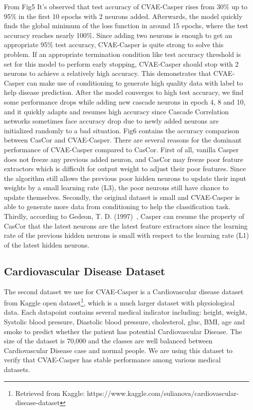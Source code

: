 From Fig5 It’s observed that test accuracy of CVAE-Casper rises from 30\% up to 95\% in the first 10 epochs with 2 neurons added. Afterwards, the model quickly finds the global minimum of the loss function in around 15 epochs, where the test accuracy reaches nearly 100\%. Since adding two neurons is enough to get an appropriate 95\% test accuracy, CVAE-Casper is quite strong to solve this problem. If an appropriate termination condition like test accuracy threshold is set for this model to perform early stopping, CVAE-Casper should stop with 2 neurons to achieve a relatively high accuracy. This demonstrates that CVAE-Casper can make use of conditioning to generate high quality data with label to help disease prediction. After the model converges to high test accuracy, we find some performance drops while adding new cascade neurons in epoch 4, 8 and 10, and it quickly adapts and resumes high accuracy since Cascade Correlation networks sometimes face accuracy drop due to newly added neurons are initialized randomly to a bad situation. Fig6 contains the accuracy comparison between CasCor and CVAE-Casper. There are several reasons for the dominant performance of CVAE-Casper compared to CasCor. First of all, vanilla Casper does not freeze any previous added neuron, and CasCor may freeze poor feature extractors which is difficult for output weight to adjust their poor features. Since the algorithm still allows the previous poor hidden neurons to update their input weights by a small learning rate (L3), the poor neurons still have chance to update themselves. Secondly, the original dataset is small and CVAE-Casper is able to generate more data from conditioning to help the classification task. Thirdly, according to Gedeon, T. D. (1997)~\cite{CASPER1997}, Casper can resume the property of CasCor that the latest neurons are the latest feature extractors since the learning rate of the previous hidden neurons is small with respect to the learning rate (L1) of the latest hidden neurons.






\subsection{Cardiovascular Disease Dataset}
The second dataset we use for CVAE-Casper is a Cardiovascular disease dataset from Kaggle open dataset\footnote{Retrieved from Kaggle: https://www.kaggle.com/sulianova/cardiovascular-disease-dataset}, which is a much larger dataset with physiological data. Each datapoint contains several medical indicator including: height, weight, Systolic blood pressure, Diastolic blood pressure, cholesterol, gluc, BMI, age and smoke to predict whether the patient has potential Cardiovascular Disease. The size of the dataset is 70,000 and the classes are well balanced between Cardiovascular Disease case and normal people. We are using this dataset to verify that CVAE-Casper has stable performance among various medical datasets.


